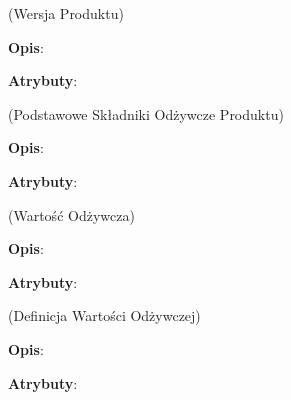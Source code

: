 \begin{enumerate}[label={\textbf{KAT/\protect\threedigits{\theenumi}}}, wide, labelwidth=!, labelindent=0pt, labelsep=0pt, series=reqs]
     \label{kat:ProductVersion} (Wersja Produktu)

    \textbf{Opis}: \lipsum[1]
    \par
    \textbf{Atrybuty}:
    \begin{itemize}[series=atr, wide, align=left, leftmargin=5cm]
         \label{kat:ProductVersion:id}
         \label{kat:ProductVersion:createdDate}
         \label{kat:ProductVersion:description}
    \end{itemize}

     \label{kat:ProductBasicNutritionData} (Podstawowe Składniki Odżywcze Produktu)

    \textbf{Opis}: \lipsum[1]
    \par
    \textbf{Atrybuty}:
    \begin{itemize}[series=atr, wide, align=left, leftmargin=5cm]
         \label{kat:ProductBasicNutritionData:id}
         \label{kat:ProductBasicNutritionData:energy}
         \label{kat:ProductBasicNutritionData:protein}
         \label{kat:ProductBasicNutritionData:fat}
         \label{kat:ProductBasicNutritionData:carbohydrates}
    \end{itemize}

     \label{kat:NutritionData} (Wartość Odżywcza)

    \textbf{Opis}: \lipsum[1]
    \par
    \textbf{Atrybuty}:
    \begin{itemize}[series=atr, wide, align=left, leftmargin=5cm]
         \label{kat:NutritionData:id}
         \label{kat:NutritionData:nutritionValue}
    \end{itemize}

     \label{kat:NutritionDefinition} (Definicja Wartości Odżywczej)

    \textbf{Opis}: \lipsum[1]
    \par
    \textbf{Atrybuty}:
    \begin{itemize}[series=atr, wide, align=left, leftmargin=5cm]
         \label{kat:NutritionDefinition:id}
         \label{kat:NutritionDefinition:tag}
         \label{kat:NutritionDefinition:description}
         \label{kat:NutritionDefinition:units}
         \label{kat:NutritionDefinition:decimalPlaces}
    \end{itemize}


\end{enumerate}
